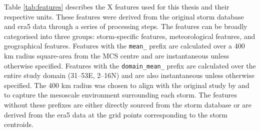 Table \ref{tab:features} describes the X features used for this thesis and their respective units. These features were derived from the original storm database and \acrshort{era5} data through a series of processing steps. The features can be broadly categorised into three groups: storm-specific features, meteorological features, and geographical features. Features with the \texttt{mean\_} prefix are calculated over a 400 km radius square-area from the MCS centre and are instantaneous unless otherwise specified. Features with the \texttt{domain\_mean\_} prefix are calculated over the entire study domain (31--53E, 2--16N) and are also instantaneous unless otherwise specified. The 400 km radius was chosen to align with the original study by \cite{Hunt2024} and to capture the mesoscale environment surrounding each storm. The features without these prefixes are either directly sourced from the storm database or are derived from the \acrshort{era5} data at the grid points corresponding to the storm centroids.

